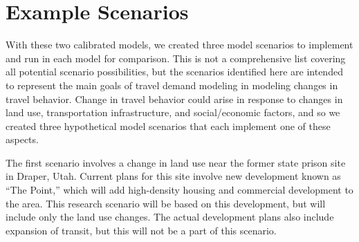 \documentclass[fancy, oneside, mastersfancy, ms]{byuthesis}
\begin{document}
\begin{table}

\caption{\label{tbl-asim-dap-model-rw-coeffs}Daily Activity Pattern
Submodel Coefficients in ActivitySim}


\end{table}%

\section{Example Scenarios}\label{example-scenarios}

With these two calibrated models, we created three model scenarios to
implement and run in each model for comparison. This is not a
comprehensive list covering all potential scenario possibilities, but
the scenarios identified here are intended to represent the main goals
of travel demand modeling in modeling changes in travel behavior. Change
in travel behavior could arise in response to changes in land use,
transportation infrastructure, and social/economic factors, and so we
created three hypothetical model scenarios that each implement one of
these aspects.

The first scenario involves a change in land use near the former state
prison site in Draper, Utah. Current plans for this site involve new
development known as ``The Point,'' which will add high-density housing
and commercial development to the area. This research scenario will be
based on this development, but will include only the land use changes.
The actual development plans also include expansion of transit, but this
will not be a part of this scenario.
\end{document}
